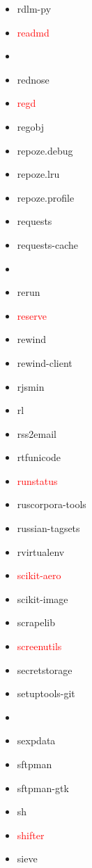 \documentclass{l4proj}
\begin{document}
\begin{appendices}
{\begin{itemize}
\item rdlm-py
\item\textcolor{red}{readmd}
\item\textcolor{red}{}
\item rednose
\item\textcolor{red}{regd}
\item regobj
\end{itemize}
}%
\clearpage
\noindent\parbox[t]{0.32\textwidth}{\raggedright%
\begin{itemize}
\item repoze.debug
\item repoze.lru
\item repoze.profile
\item requests
\item requests-cache
\item\textcolor{red}{}
\item rerun
\item\textcolor{red}{reserve}
\item rewind
\item rewind-client
\item rjsmin
\item rl
\item rss2email
\item rtfunicode
\item\textcolor{red}{runstatus}
\item ruscorpora-tools
\item russian-tagsets
\item rvirtualenv
\item\textcolor{red}{scikit-aero}
\item scikit-image
\item scrapelib
\item\textcolor{red}{screenutils}
\item secretstorage
\item setuptools-git
\item {}
\item sexpdata
\item sftpman
\end{itemize}
}%
\noindent\parbox[t]{0.32\textwidth}{\raggedright%
\begin{itemize}
\item sftpman-gtk
\item sh
\item\textcolor{red}{shifter}
\item sieve

\end{itemize}}
\end{appendices}
\end{document}
